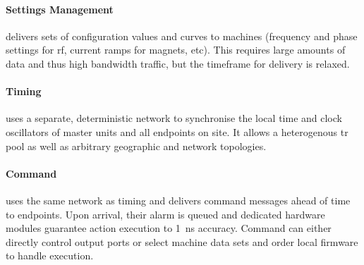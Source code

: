 \paragraph{Settings Management} delivers sets of configuration values and curves to machines (frequency and phase settings for \gls{rf}, current ramps for magnets, etc). This requires large amounts of data and thus high bandwidth traffic, but the timeframe for delivery is relaxed.
\paragraph{Timing} uses a separate, deterministic network to synchronise the local time and clock oscillators of master units and all endpoints on site. It allows a heterogenous \gls{tr} pool as well as arbitrary geographic and network topologies.
\paragraph{Command} uses the same network as timing and delivers command messages ahead of time to endpoints. Upon arrival, their alarm is queued and dedicated hardware modules guarantee action execution to \SI{1}{\nano\second} accuracy. Command can either directly control output ports or select machine data sets and order local firmware to handle execution.
\vspace{-1cm}
